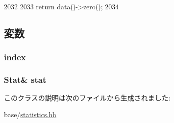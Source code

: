 \begin{DoxyCode}
2032     {
2033         return data()->zero();
2034     }
\end{DoxyCode}


\subsection{変数}
\hypertarget{classStats_1_1DistProxy_a9707c4a1627041aeffc05da26c91acff}{
\subsubsection[{index}]{ {\bf index}}}
\label{classStats_1_1DistProxy_a9707c4a1627041aeffc05da26c91acff}
\hypertarget{classStats_1_1DistProxy_a7fee3822515c4dc6b8b99a8bf35fa6b8}{
\subsubsection[{stat}]{\setlength{\rightskip}{0pt plus 5cm}Stat\& {\bf stat}}}
\label{classStats_1_1DistProxy_a7fee3822515c4dc6b8b99a8bf35fa6b8}


このクラスの説明は次のファイルから生成されました:\begin{DoxyCompactItemize}
\item 
base/\hyperlink{statistics_8hh}{statistics.hh}\end{DoxyCompactItemize}
